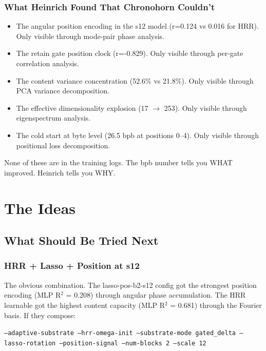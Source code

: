 \documentclass[11pt,a4paper]{report}
\begin{document}
\section{What Heinrich Found That Chronohorn Couldn't}

\begin{itemize}[nosep]
\item The angular position encoding in the s12 model (r=0.124 vs 0.016 for HRR). Only visible through mode-pair phase analysis.
\item The retain gate position clock (r=-0.829). Only visible through per-gate correlation analysis.
\item The content variance concentration (52.6\% vs 21.8\%). Only visible through PCA variance decomposition.
\item The effective dimensionality explosion (17 $\to$ 253). Only visible through eigenspectrum analysis.
\item The cold start at byte level (26.5 bpb at positions 0--4). Only visible through positional loss decomposition.
\end{itemize}

None of these are in the training logs. The bpb number tells you WHAT improved. Heinrich tells you WHY.


\part{The Ideas}

\chapter{What Should Be Tried Next}

\section{HRR + Lasso + Position at s12}

The obvious combination. The lasso-pos-b2-s12 config got the strongest position encoding (MLP R$^2$ = 0.208) through angular phase accumulation. The HRR learnable got the highest content capacity (MLP R$^2$ = 0.681) through the Fourier basis. If they compose:

\texttt{--adaptive-substrate --hrr-omega-init --substrate-mode gated\_delta --lasso-rotation --position-signal --num-blocks 2 --scale 12}
\end{document}
